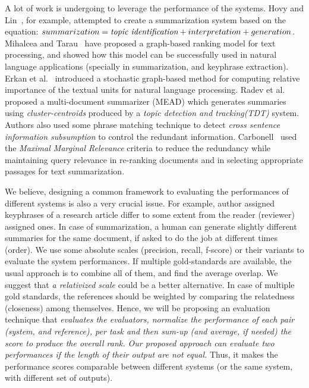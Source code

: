 \documentclass[a4paper]{report}
\begin{document}
 
 \par A lot of work is undergoing to leverage the performance of the systems. Hovy and Lin~\cite{Hovy:1998:ATS:1119089.1119121}, for example, attempted to create a summarization system based on the equation: 
 $summarization = \text{\it topic identification} + interpretation + generation$. Mihalcea and Tarau~\cite{Mihalcea04TextRank} have proposed a graph-based ranking model for text processing, and showed how this model can be successfully used in natural language applications (specially in summarization, and keyphrase extraction). Erkan et al.~\cite{Erkan:2004:LGL:1622487.1622501} introduced a stochastic graph-based method for computing relative importance of the textual units for natural language processing. Radev et al.~\cite{Radev:2000:CSM:1117575.1117578} proposed a multi-document summarizer (MEAD) which generates summaries using \emph{cluster-centroids} produced by a \emph{topic detection and tracking(TDT)} system. Authors also used some phrase matching technique to detect \emph{cross sentence information subsumption} to control the redundant information.  Carbonell~\cite{Carbonell98theuse} used the \emph{Maximal Marginal Relevance} criteria to reduce the redundancy while maintaining query relevance in re-ranking documents and in selecting appropriate passages for text summarization.\\
 
 \par We believe, designing a common framework to evaluating the performances of different systems is also a very crucial issue. For example, author assigned keyphrases of a research article differ to some extent from the reader (reviewer) assigned ones. In case of summarization, a human can generate slightly different summaries for the same document, if asked to do the job at different times (order). We use some absolute scales (precision, recall, f-score) or their variants to evaluate the system performances. If multiple gold-standards are available, the usual approach is to {combine all of them, and find the average overlap}. We suggest that \emph{a relativized scale} could be a better alternative. In case of multiple gold standards, the references should be weighted by comparing the relatedness (closeness) among themselves. Hence, we will be proposing an evaluation technique that \emph{evaluates the evaluators, normalize the performance of each pair (system, and reference), per task and then sum-up (and average, if needed) the score to produce the overall rank. Our proposed approach can evaluate two performances if the length of their output are not equal.} Thus, it makes the performance scores comparable between different systems (or the same system, with different set of outputs). \\  
  
\end{document}
